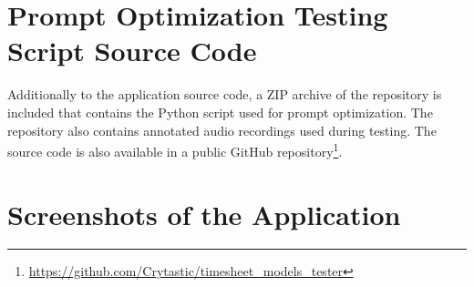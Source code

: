 \documentclass[
  digital,     %
  oneside,     %
  nosansbold,  %
  nocolorbold, %
  lof,         %
  lot,         %
]{fithesis4}
\begin{document}
\chapter{Prompt Optimization Testing Script Source Code}
Additionally to the application source code, a ZIP archive of the repository is included that contains the Python script used for prompt optimization. The repository also contains annotated audio recordings used during testing. The source code is also available in a public GitHub repository\footnote{
\url{https://github.com/Crytastic/timesheet_models_tester}
}.

\chapter{Screenshots of the Application}

\begin{center}
\begin{minipage}{0.45\textwidth}
  \begin{figure}[H]
    \centering

\end{figure}
\end{minipage}
\end{center}
\end{document}
